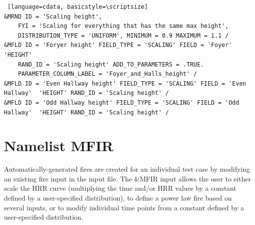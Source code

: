 \documentclass[12pt,twoside]{book}
\begin{document}
\vspace{\baselineskip}
\begin{lstlisting} [language=cdata, basicstyle=\scriptsize]
&MRND ID = 'Scaling height',
	FYI = 'Scaling for everything that has the same max height',
	DISTRIBUTION_TYPE = 'UNIFORM', MINIMUM = 0.9 MAXIMUM = 1.1 /
&MFLD ID = 'Foryer height' FIELD_TYPE = 'SCALING' FIELD = 'Foyer'  'HEIGHT'
    RAND_ID = 'Scaling height' ADD_TO_PARAMETERS = .TRUE.
    PARAMETER_COLUMN_LABEL = 'Foyer_and_Halls_height' /
&MFLD ID = 'Even Hallway height' FIELD_TYPE = 'SCALING' FIELD = 'Even Hallway'  'HEIGHT' RAND_ID = 'Scaling height' /
&MFLD ID = 'Odd Hallway height' FIELD_TYPE = 'SCALING' FIELD = 'Odd Hallway'  'HEIGHT' RAND_ID = 'Scaling height' /
\end{lstlisting}

\clearpage

\section{Namelist MFIR}
\label{info:MFIR}

Automatically-generated fires are created for an individual test case by modifying an existing fire input in the input file. The {\ct \&MFIR} input allows the user to either scale the HRR curve (multiplying the time and/or HRR values by a constant defined by a user-specified distribution), to define a power law fire based on several inputs, or to modify individual time points from a constant defined by a user-specified distribution.
\end{document}
